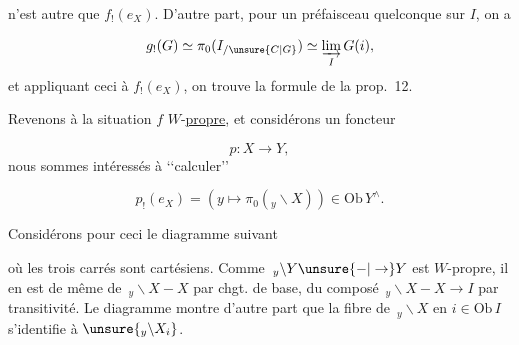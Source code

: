n'est autre que $f_!(e_X)$. D'autre part, pour un préfaisceau quelconque  sur $I$, on a

\[
g_!(G)\simeq\pi_0(I_{/\unsure{C|G}})\simeq\underset{I}{\varinjlim}\,G(i),
\]
et appliquant ceci à $f_!(e_X)$, on trouve la formule \unsure{($\alpha$)} de la prop.~12.

Revenons à la situation  $f$ $W$-\uline{propre}, et considérons un foncteur

\[
p:X\longrightarrow Y,
\]
nous sommes intéressés à \lq\lq calculer\rq\rq

\[
p_!(e_X)=(y\mapsto\pi_0({}_y\backslash X))\in\mathrm{Ob}\,Y^\wedge .
\]

Considérons pour ceci le diagramme suivant

où les trois carrés sont cartésiens. Comme $\,{}_y\backslash Y\unsure{-|\to}Y$ est $W$-propre, il en est de même de $\,{}_y\backslash X-X$ par chgt. de base,  du composé $\,{}_y\backslash X-X\longrightarrow I$ par transitivité. Le diagramme montre d'autre part que la fibre de $\,{}_y\backslash X$ en $i\in\mathrm{Ob}\,I$ s'identifie à $\unsure{{}_y\backslash X_i}$.
